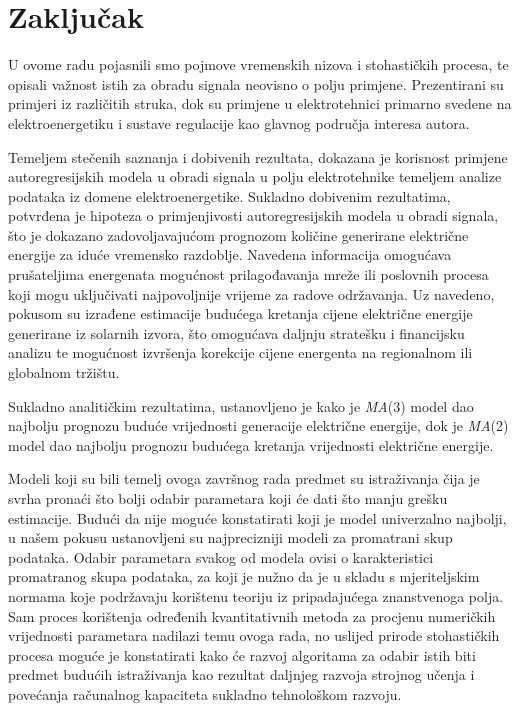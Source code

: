 \documentclass[a4paper,12pt,oneside]{memoir}
\begin{document}
    \chapter{Zaključak}

        U ovome radu pojasnili smo pojmove vremenskih nizova i stohastičkih procesa, te opisali važnost istih za obradu signala neovisno o polju primjene. Prezentirani su primjeri iz različitih struka, dok su primjene u elektrotehnici primarno svedene na elektroenergetiku i sustave regulacije kao glavnog područja interesa autora.
        
        Temeljem stečenih saznanja i dobivenih rezultata, dokazana je korisnost primjene autoregresijskih modela u obradi signala u polju elektrotehnike temeljem analize podataka iz domene elektroenergetike. Sukladno dobivenim rezultatima, potvrđena je hipoteza o primjenjivosti autoregresijskih modela u obradi signala, što je dokazano zadovoljavajućom prognozom količine generirane električne energije za iduće vremensko razdoblje. Navedena informacija omogućava prušateljima energenata mogućnost prilagođavanja mreže ili poslovnih procesa koji mogu uključivati najpovoljnije vrijeme za radove održavanja. Uz navedeno, pokusom su izrađene estimacije budućega kretanja cijene električne energije generirane iz solarnih izvora, što omogućava daljnju stratešku i financijsku analizu te mogućnost izvršenja korekcije cijene energenta na regionalnom ili globalnom tržištu.

        Sukladno analitičkim rezultatima, ustanovljeno je kako je \textit{MA}(3) model dao najbolju prognozu buduće vrijednosti generacije električne energije, dok je \textit{MA}(2) model dao najbolju prognozu budućega kretanja vrijednosti električne energije.

        Modeli koji su bili temelj ovoga završnog rada predmet su istraživanja čija je svrha pronaći što bolji odabir parametara koji će dati što manju grešku estimacije. Budući da nije moguće konstatirati koji je model univerzalno najbolji, u našem pokusu ustanovljeni su najprecizniji modeli za promatrani skup podataka. Odabir parametara svakog od modela ovisi o karakteristici promatranog skupa podataka, za koji je nužno da je u skladu s mjeriteljskim normama koje podržavaju korištenu teoriju iz pripadajućega znanstvenoga polja. Sam proces korištenja određenih kvantitativnih metoda za procjenu numeričkih vrijednosti parametara nadilazi temu ovoga rada, no uslijed prirode stohastičkih procesa moguće je konstatirati kako će razvoj algoritama za odabir istih biti predmet budućih istraživanja kao rezultat daljnjeg razvoja strojnog učenja i povećanja računalnog kapaciteta sukladno tehnološkom razvoju.
 
\end{document}

